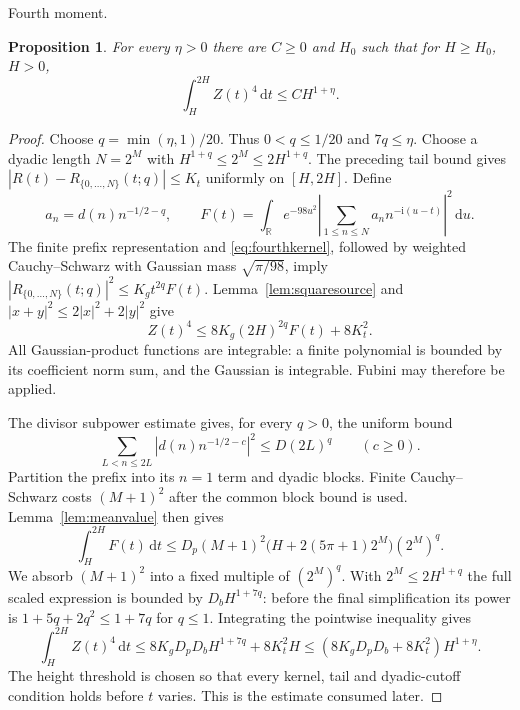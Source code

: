 \documentclass[11pt,a4paper]{article}
\numberwithin{equation}{section}
\newtheorem{proposition}[theorem]{Proposition}
\theoremstyle{definition}
\newcommand{\R}{\mathbb R}
\newcommand{\dd}{\,\mathrm d}
\newcommand{\ii}{\mathrm i}
\newcommand{\zabs}{Z}
\begin{document}
\par\medskip\noindent Fourth moment.
\begin{proposition}\label{prop:fourth}
For every $\eta>0$ there are $C\ge0$ and $H_0$ such that for $H\ge H_0$,
$H>0$,
\[
 \int_H^{2H}\zabs(t)^4\dd t\le C H^{1+\eta}.
\]
\end{proposition}
\begin{proof}
Choose $q=\min(\eta,1)/20$. Thus $0<q\le1/20$
and $7q\le\eta$.
Choose a dyadic length $N=2^M$ with
$H^{1+q}\le2^M\le2H^{1+q}$. The preceding tail bound gives
$|R(t)-R_{\{0,\ldots,N\}}(t;q)|\le K_t$ uniformly on $[H,2H]$.
Define
\[
 a_n=d(n)n^{-1/2-q},\qquad
 F(t)=\int_{\R}e^{-98u^2}\left|\sum_{1\le n\le N}a_n n^{-\ii(u-t)}\right|^2\dd u.
\]
The finite prefix representation and \eqref{eq:fourthkernel}, followed by weighted
Cauchy--Schwarz with Gaussian mass $\sqrt{\pi/98}$, imply
$|R_{\{0,\ldots,N\}}(t;q)|^2\le K_g t^{2q}F(t)$.
Lemma~\ref{lem:squaresource} and $|x+y|^2\le2|x|^2+2|y|^2$ give
\[
 \zabs(t)^4\le8K_g(2H)^{2q}F(t)+8K_t^2.
\]
All Gaussian-product functions are integrable: a finite polynomial is bounded
by its coefficient norm sum, and the Gaussian is integrable. Fubini may
therefore be applied.

The divisor subpower estimate gives, for every $q>0$, the uniform bound
\[
 \sum_{L<n\le2L}|d(n)n^{-1/2-c}|^2\le D(2L)^q\qquad(c\ge0).
\]
Partition the prefix into its $n=1$ term and dyadic blocks. Finite
Cauchy--Schwarz costs $(M+1)^2$ after the common block bound is used.
Lemma~\ref{lem:meanvalue} then gives
\[
 \int_H^{2H}F(t)\dd t
 \le D_p(M+1)^2\bigl(H+2(5\pi+1)2^M\bigr)(2^M)^q.
\]
We absorb $(M+1)^2$ into a fixed multiple of $(2^M)^q$.
With $2^M\le2H^{1+q}$ the full scaled expression is bounded by
$D_b H^{1+7q}$: before the final simplification its power is
$1+5q+2q^2\le1+7q$ for $q\le1$.
Integrating the pointwise inequality gives
\[
 \int_H^{2H}\zabs(t)^4\dd t
 \le8K_gD_pD_bH^{1+7q}+8K_t^2H
 \le(8K_gD_pD_b+8K_t^2)H^{1+\eta}.
\]
The height threshold is chosen so that every kernel, tail and dyadic-cutoff
condition holds before $t$ varies. This is the estimate consumed later.
\end{proof}
\end{document}
